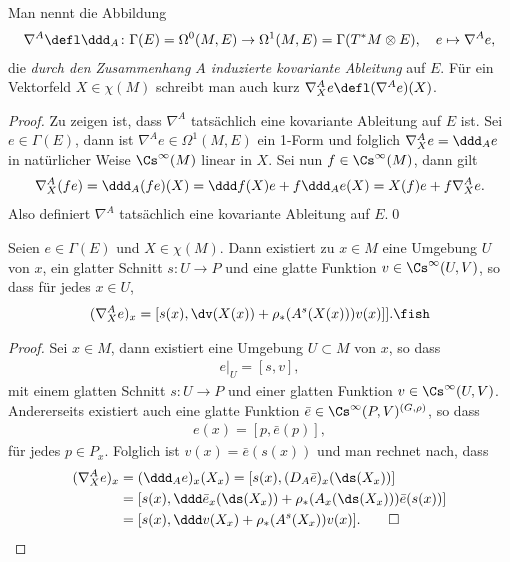 \documentclass[%
	paper=a5,%
	fleqn,%
	DIV=18,%
	BCOR=0mm,
	fontsize=11pt,
	titlepage=false,%
	bibliography=totoc,
	DIV=18,%
	twoside=true,
	pdftitle=Riemannsche Geometrie,
	pdfauthor=Uwe Semmelmann,
	numbers=noendperiod]%
	{scrbook}
\begin{document}
\begin{defn}
Man nennt die Abbildung
\begin{align*}
\nabla^A \defl \ddd_A \colon \Gamma(E)=\Omega^0(M,E)\to
\Omega^1(M,E) = \Gamma(T^*M \otimes E),\quad e\mapsto \nabla^A e,
\end{align*}
die \emph{durch den Zusammenhang $A$ induzierte kovariante Ableitung} auf $E$.
Für ein Vektorfeld $X\in \chi(M)$ schreibt man auch kurz $\nabla^A_Xe \defl
(\nabla^A e)(X)$.\fish
\end{defn}
\begin{proof}
Zu zeigen ist, dass $\nabla^A$ tatsächlich eine kovariante Ableitung auf $E$
ist. Sei $e\in\Gamma(E)$, dann ist $\nabla^A e\in\Omega^1(M,E)$ ein 1-Form und
folglich $\nabla^A_X e = \ddd_A e$ in natürlicher Weise $\Cs^\infty(M)$ linear
in $X$. Sei nun $f\in\Cs^\infty(M)$, dann gilt
\begin{align*}
\nabla_X^A (fe) = \ddd_A (fe)(X)
= \ddd f(X)e + f\ddd_A e(X)
= X(f)e + f\nabla_X^A e.
\end{align*}
Also definiert $\nabla^A$ tatsächlich eine kovariante Ableitung auf $E$.\qed
\end{proof}

\begin{prop}
Seien $e\in\Gamma(E)$ und $X\in\chi(M)$. Dann existiert zu $x\in M$ eine
Umgebung $U$ von $x$, ein glatter Schnitt $s\colon U\to P$ und eine glatte
Funktion $v\in \Cs^\infty(U,V)$, so dass für jedes $x\in U$,
\begin{align*}
(\nabla_X^A e)_x = [s(x),\dv(X(x))+\rho_*(A^s(X(x)))v(x)]].\fish
\end{align*}
\end{prop}
\begin{proof}
Sei $x\in M$, dann existiert eine Umgebung $U\subset M$ von $x$, so dass
\begin{align*}
e\big|_U = [s,v],
\end{align*}
mit einem glatten Schnitt $s\colon U\to P$ und einer glatten Funktion
$v\in\Cs^\infty(U,V)$. Andererseits existiert auch eine glatte Funktion
$\bar{e}\in \Cs^\infty(P,V)^{(G,\rho)}$, so dass
\begin{align*}
e(x) = [p,\bar{e}(p)],
\end{align*}
für jedes $p\in P_x$. Folglich ist $v(x) = \bar{e}(s(x))$ und man rechnet nach,
dass
\begin{align*}
(\nabla_X^A e)_x &= (\ddd_A e)_x(X_x)
= [s(x),(D_A \bar{e})_x(\ds(X_x))]\\
&= [s(x),\ddd \bar{e}_x(\ds(X_x)) + \rho_*(A_x(\ds(X_x)))\bar{e}(s(x))]\\
&= [s(x),\ddd v(X_x) + \rho_*(A^s(X_x))v(x)].\qed
\end{align*}
\end{proof}
\end{document}
